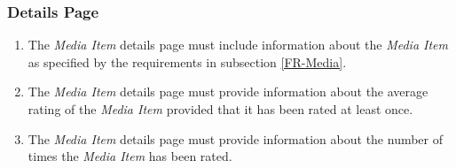 \documentclass[../report.tex]{subfiles}
\begin{document}
\subsubsection {Details Page}

\begin{enumerate}[label=\textbf{FR-\twodigits*}, resume]
	\item The \textit{Media Item} details page must include information about the \textit{Media Item} as specified by the requirements in subsection \ref{FR-Media}.
	\item The \textit{Media Item} details page must provide information about the average rating of the \textit{Media Item} provided that it has been rated at least once.
	\item The \textit{Media Item} details page must provide information about the number of times the \textit{Media Item} has been rated.
\end{enumerate}
			
\end{document}
